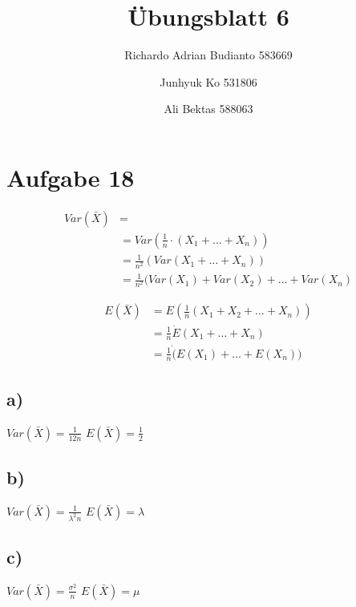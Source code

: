 \documentclass{article}
\title{Übungsblatt 6}
\author{Richardo Adrian Budianto  583669 \and Junhyuk Ko  531806 \and Ali Bektas 588063 }
\begin{document}
\maketitle

\section*{Aufgabe 18}
	\begin{align*}
		Var(\bar{X}) &= \\
		&= Var(\frac{1}{n} \cdot (X_1 + \dots + X_n))\\
		&= \frac{1}{n^2} (Var(X_1+ \dots + X_n)) \\
	 	&=  \frac{1}{n^2} (Var(X_1) + Var(X_2) + \dots + Var(X_n)
	\end{align*} 

	\begin{align*}
		E(\bar{X}) &= E( \frac{1}{n} (X_1 + X_2 + \dots + X_n)) \\
			&= \frac{1}{n} \dot E(X_1 + \dots + X_n)\\
			&=  \frac{1}{n} \dot ( E(X_1) + \dots + E(X_n))
	\end{align*}

	\subsection*{a)}
		$Var(\bar{X}) = \frac{1}{12n}$
		$E(\bar{X}) = \frac{1}{2}$

	\subsection*{b)}
		$Var(\bar{X}) = \frac{1}{\lambda^2n}$
		$E(\bar{X}) = \lambda$

	\subsection*{c)}
		$Var(\bar{X}) = \frac{\sigma^2}{n}$
		$E(\bar{X}) = \mu$
\end{document}
